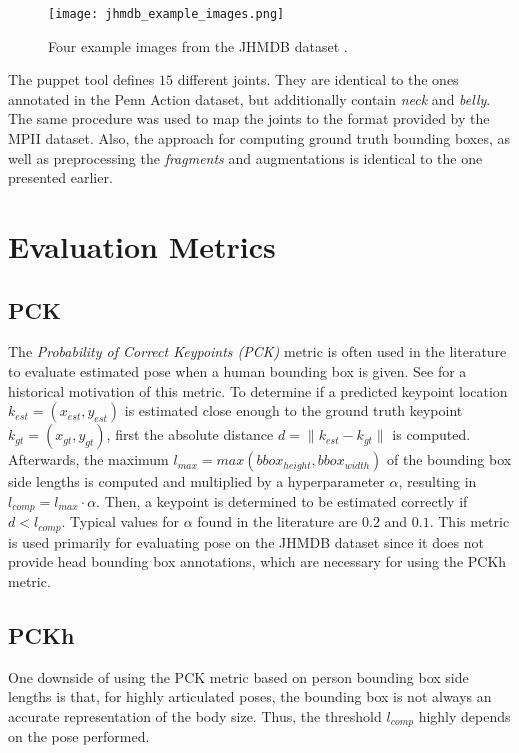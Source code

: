 \begin{figure}[htb!]
    \centering
    \texttt{[image: jhmdb\_example\_images.png]}
    \caption{Four example images from the JHMDB dataset \cite{jhuang_towards_2013}. }
    \label{fig:jhmdb_example_images}
\end{figure}

The puppet tool defines $15$ different joints.
They are identical to the ones annotated in the Penn Action dataset, but additionally contain \textit{neck} and \textit{belly}.
The same procedure was used to map the joints to the format provided by the MPII dataset.
Also, the approach for computing ground truth bounding boxes, as well as preprocessing the \textit{fragments} and augmentations is identical to the one presented earlier. %

\section{Evaluation Metrics}
\label{sec:exp-metrics}
\subsection{PCK}
\label{sec:exp-pck}

The \textit{Probability of Correct Keypoints (PCK)} metric \cite{ferrari_progressive_2008} is often used in the literature to evaluate estimated pose when a human bounding box is given.
See  for a historical motivation of this metric.
To determine if a predicted keypoint location $k_{est} = (x_{est}, y_{est})$ is estimated close enough to the ground truth keypoint $k_{gt} = (x_{gt}, y_{gt})$, first the absolute distance $d = \lVert k_{est} - k_{gt} \rVert$ is computed.
Afterwards, the maximum $l_{max} = max(bbox_{height}, bbox_{width})$ of the bounding box side lengths is computed and multiplied by a hyperparameter $\alpha$, resulting in $l_{comp} = l_{max} \cdot \alpha$.
Then, a keypoint is determined to be estimated correctly if $d < l_{comp}$.
Typical values for $\alpha$ found in the literature are $0.2$ and $0.1$.
This metric is used primarily for evaluating pose on the JHMDB dataset since it does not provide head bounding box annotations, which are necessary for using the PCKh metric.

\subsection{PCKh}
\label{sec:exp-pckh}
One downside of using the PCK metric based on person bounding box side lengths is that, for highly articulated poses, the bounding box is not always an accurate representation of the body size.
Thus, the threshold $l_{comp}$ highly depends on the pose performed.

